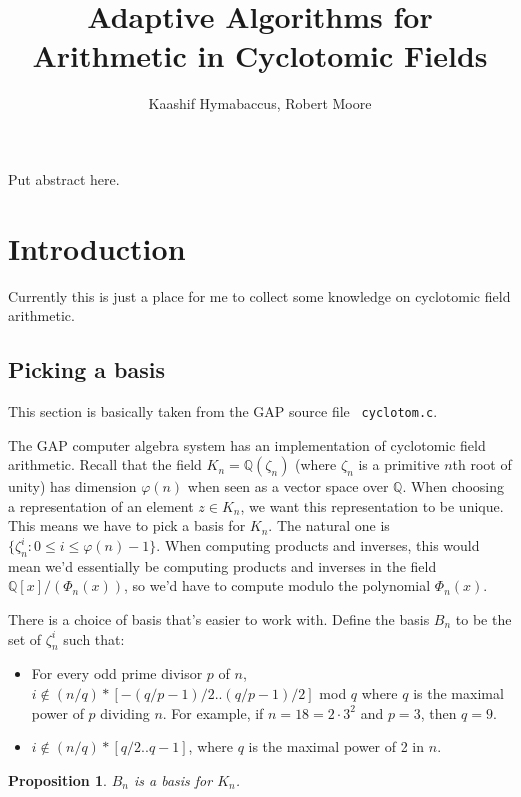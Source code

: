 \documentclass{article}
\title{Adaptive Algorithms for Arithmetic in Cyclotomic Fields}
\author{Kaashif Hymabaccus, Robert Moore}
\newtheorem{prop}{Proposition}
\begin{document}
\maketitle

Put abstract here.

\section{Introduction}

Currently this is just a place for me to collect some knowledge on
cyclotomic field arithmetic.

\subsection{Picking a basis}

This section is basically taken from the GAP source file {\tt
  cyclotom.c}.

The GAP computer algebra system has an implementation of cyclotomic
field arithmetic. Recall that the field $K_n = \mathbb{Q}(\zeta_n)$
(where $\zeta_n$ is a primitive $n$th root of unity) has dimension
$\varphi(n)$ when seen as a vector space over $\mathbb{Q}$. When
choosing a representation of an element $z \in K_n$, we want this
representation to be unique. This means we have to pick a basis for
$K_n$. The natural one is
$\{ \zeta_n^i : 0 \leq i \leq \varphi(n)-1 \}$. When computing
products and inverses, this would mean we'd essentially be computing
products and inverses in the field $\mathbb{Q}[x]/(\Phi_n(x))$, so
we'd have to compute modulo the polynomial $\Phi_n(x)$.

There is a choice of basis that's easier to work with. Define the
basis $B_n$ to be the set of $\zeta_n^i$ such that:

\begin{itemize}
\item For every odd prime divisor $p$ of $n$,
  $i \notin (n/q)*[-(q/p-1)/2..(q/p-1)/2]$ mod $q$ where $q$ is the
  maximal power of $p$ dividing $n$. For example, if
  $n = 18 = 2 \cdot 3^2$ and $p=3$, then $q=9$.

\item $i \notin (n/q)*[q/2..q-1]$, where $q$ is the maximal power of 2
  in $n$.
\end{itemize}

\begin{prop}
$B_n$ is a basis for $K_n$.
\end{prop}
\end{document}
